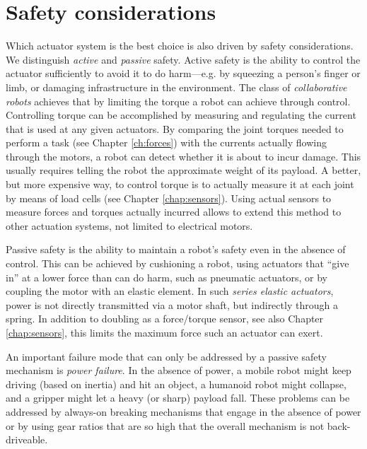 \section{Safety considerations}\label{sec:actuators:safety}
Which actuator system is the best choice is also driven by safety considerations. We distinguish \textsl{active} and \textsl{passive} safety. Active safety is the ability to control the actuator sufficiently to avoid it to do harm---e.g. by squeezing a person's finger or limb, or damaging infrastructure in the environment. The class of \textsl{collaborative robots} achieves that by limiting the torque a robot can achieve through control. %
Controlling torque can be accomplished by measuring and regulating the current that is used at any given actuators. By comparing the joint torques needed to perform a task (see Chapter \ref{ch:forces}) with the currents actually flowing through the motors, a robot can detect whether it is about to incur damage.
This usually requires telling the robot the approximate weight of its payload. A better, but more expensive way, to control torque is to actually measure it at each joint by means of load cells (see Chapter \ref{chap:sensors}). Using actual sensors to measure forces and torques actually incurred allows to extend this method to other actuation systems, not limited to electrical motors.

Passive safety is the ability to maintain a robot's safety even in the absence of control. This can be achieved by cushioning a robot, using actuators that ``give in'' at a lower force than can do harm, such as pneumatic actuators, or by coupling the motor with an elastic element. In such \textsl{series elastic actuators}, power is not directly transmitted via a motor shaft, but indirectly through a spring. In addition to doubling as a force/torque sensor, see also Chapter \ref{chap:sensors}, this limits the maximum force such an actuator can exert.

An important failure mode that can only be addressed by a passive safety mechanism is \textsl{power failure}. In the absence of power, a mobile robot might keep driving (based on inertia) and hit an object, a humanoid robot might collapse, and a gripper might let a heavy (or sharp) payload fall. These problems can be addressed by always-on breaking mechanisms that engage in the absence of power or by using gear ratios that are so high that the overall mechanism is not back-driveable.

